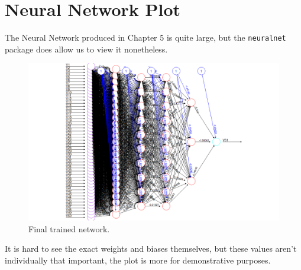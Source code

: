 \chapter{Neural Network Plot}

The Neural Network produced in Chapter 5 is quite large, but the \verb|neuralnet| package does allow us to view it nonetheless. \\

\begin{figure}[h] 
    \centering
    \includegraphics[width=1.2\linewidth]{figures/bestnet.png}
    \caption{Final trained network. }
    \label{bestnet}
\end{figure}

It is hard to see the exact weights and biases themselves, but these values aren't individually that important, the plot is more for 
demonstrative purposes.